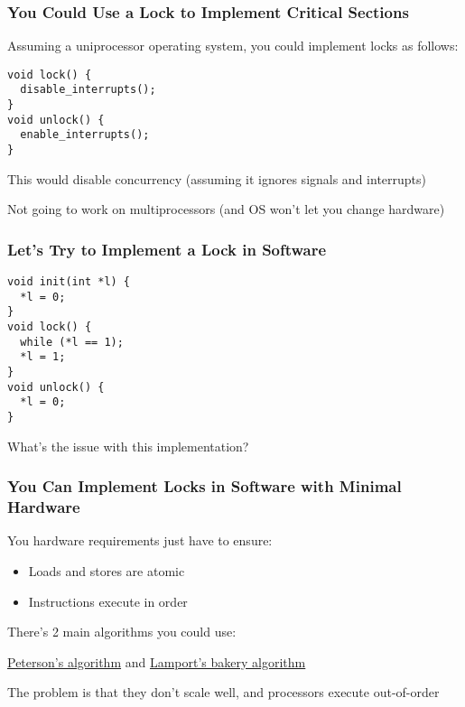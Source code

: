   \begin{frame}[fragile]
    \frametitle{You Could Use a Lock to Implement Critical Sections}

    Assuming a uniprocessor operating system, you could implement locks as follows:

    \vspace{2em}

    \begin{lstlisting}
void lock() {
  disable_interrupts();
}
void unlock() {
  enable_interrupts();
}   
    \end{lstlisting}

    \vspace{2em}

    This would disable concurrency (assuming it ignores signals and interrupts)

    \hspace{2em} Not going to work on multiprocessors (and OS won't let you change hardware)
  \end{frame}

  \begin{frame}[fragile]
    \frametitle{Let's Try to Implement a Lock in Software}

    \begin{lstlisting}
void init(int *l) {
  *l = 0;
}
void lock() {
  while (*l == 1);
  *l = 1;
}
void unlock() {
  *l = 0;
}   
    \end{lstlisting}

    What's the issue with this implementation?

    \vspace{2em}


    
  \end{frame}

  \begin{frame}
    \frametitle{You Can Implement Locks in Software with Minimal Hardware}

    You hardware requirements just have to ensure:
    \begin{itemize}
      \item Loads and stores are atomic
      \item Instructions execute in order
    \end{itemize}

    \vspace{2em}

    There's 2 main algorithms you could use:

    \hspace{2em}
    \href{https://en.wikipedia.org/wiki/Peterson\%27s_algorithm}
    {Peterson's algorithm}
    and
    \href{http://en.wikipedia.org/wiki/Lamport\%27s_bakery_algorithm}
         {Lamport's bakery algorithm}

    \vspace{2em}

    The problem is that they don't scale well, and processors execute
    out-of-order
  \end{frame}

